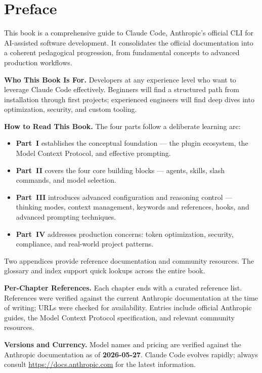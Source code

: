 \chapter*{Preface}

This book is a comprehensive guide to Claude Code, Anthropic's official CLI
for AI-assisted software development. It consolidates the official documentation
into a coherent pedagogical progression, from fundamental concepts to advanced
production workflows.

\medskip\noindent
\textbf{Who This Book Is For.}
Developers at any experience level who want to leverage Claude Code effectively.
Beginners will find a structured path from installation through first projects;
experienced engineers will find deep dives into optimization, security, and
custom tooling.

\medskip\noindent
\textbf{How to Read This Book.}
The four parts follow a deliberate learning arc:
\begin{itemize}
  \item \textbf{Part~I} establishes the conceptual foundation — the plugin
        ecosystem, the Model Context Protocol, and effective prompting.
  \item \textbf{Part~II} covers the four core building blocks — agents, skills,
        slash commands, and model selection.
  \item \textbf{Part~III} introduces advanced configuration and reasoning
        control — thinking modes, context management, keywords and
        references, hooks, and advanced prompting techniques.
  \item \textbf{Part~IV} addresses production concerns: token optimization,
        security, compliance, and real-world project patterns.
\end{itemize}
Two appendices provide reference documentation and community resources. The
glossary and index support quick lookups across the entire book.

\medskip\noindent
\textbf{Per-Chapter References.}
Each chapter ends with a curated reference list. References were verified
against the current Anthropic documentation at the time of writing; URLs were
checked for availability. Entries include official Anthropic guides, the Model
Context Protocol specification, and relevant community resources.

\medskip\noindent
\textbf{Versions and Currency.}
Model names and pricing are verified against the Anthropic documentation as of
\textbf{2026-05-27}. Claude Code evolves rapidly; always consult
\url{https://docs.anthropic.com} for the latest information.

\cleardoublepage

